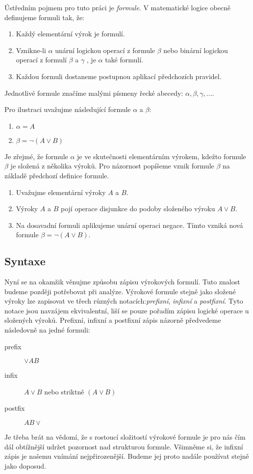 \documentclass[thesis=B,czech]{FITthesis}[2012/06/26]
\begin{document}
Ústředním pojmem pro tuto práci je \emph{formule}. V matematické logice obecně definujeme formuli tak, že:
\begin{enumerate}
\item Každý elementární výrok je formulí.
\item Vznikne-li $\alpha$ unární logickou operací z formule $\beta$ nebo binární logickou operací z formulí $\beta$ a $\gamma$ , je $\alpha$ také formulí.
\item Každou formuli dostaneme postupnou aplikací předchozích pravidel\cite{sochor}.
\end{enumerate}
Jednotlivé formule značíme malými písmeny řecké abecedy: $\alpha , \beta , \gamma , ...$.

Pro ilustraci uvažujme následující formule $\alpha$ a $\beta$:
\begin{enumerate}
\item $\alpha = A$
\item $\beta = \neg (A \vee B)$
\end{enumerate}
Je zřejmé, že formule $\alpha$ je ve skutečnosti elementárním výrokem, kdežto formule $\beta$ je složená z několika výroků. Pro názornost popíšeme vznik formule $\beta$ na základě předchozí definice formule.
\begin{enumerate}
\item Uvažujme elementární výroky $A$ a $B$.
\item Výroky $A$ a $B$ pojí operace disjunkce do podoby složeného výroku $A \vee B$.
\item Na dosavadní formuli aplikujeme unární operaci negace. Tímto vzniká nová formule $\beta = \neg (A\vee B)$.
\end{enumerate}

\subsection{Syntaxe}

Nyní se na okamžik věnujme způsobu zápisu výrokových formulí. Tuto znalost budeme později potřebovat při analýze. Výrokové formule stejně jako složené výroky lze zapisovat ve třech různých notacích:\emph{prefixní}, \emph{infixní} a \emph{postfixní}. Tyto notace jsou navzájem ekvivalentní, liší se pouze pořadím zápisu logické operace u složených výroků. Prefixní, infixní a postfixní zápis názorně předvedeme následovně na jedné formuli:
\begin{description}
\item[prefix] $\vee AB$
\item[infix] $A \vee B$ nebo striktně $(A \vee B)$
\item[postfix] $AB \vee$
\end{description}
Je třeba brát na vědomí, že s rostoucí složitostí výrokové formule je pro nás čím dál obtížnější udržet pozornost nad strukturou formule. Všimněme si, že infixní zápis je našemu vnímání nejpřirozenější. Budeme jej proto nadále používat stejně jako doposud.
\end{document}
